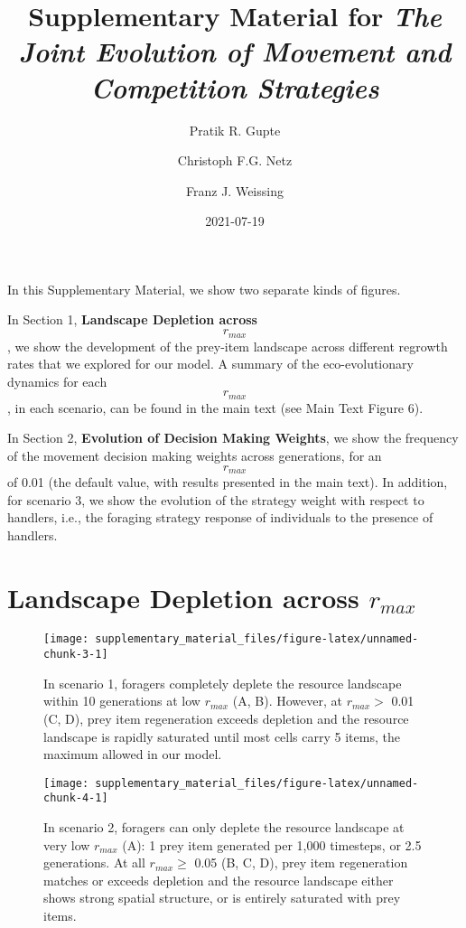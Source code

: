\documentclass[
]{scrreprt}
\title{Supplementary Material for \emph{The Joint Evolution of Movement and Competition Strategies}}
\author{Pratik R. Gupte \and Christoph F.G. Netz \and Franz J. Weissing}
\date{2021-07-19}
\begin{document}
\maketitle

In this Supplementary Material, we show two separate kinds of figures.

In Section 1, \textbf{Landscape Depletion across \[r_{max}\]}, we show the development of the prey-item landscape across different regrowth rates that we explored for our model. A summary of the eco-evolutionary dynamics for each \[r_{max}\], in each scenario, can be found in the main text (see Main Text Figure 6).

In Section 2, \textbf{Evolution of Decision Making Weights}, we show the frequency of the movement decision making weights across generations, for an \[r_{max}\] of 0.01 (the default value, with results presented in the main text). In addition, for scenario 3, we show the evolution of the strategy weight with respect to handlers, i.e., the foraging strategy response of individuals to the presence of handlers.

\hypertarget{landscape-depletion-across-r_max}{%
\chapter{\texorpdfstring{Landscape Depletion across \(r_{max}\)}{Landscape Depletion across r\_\{max\}}}\label{landscape-depletion-across-r_max}}

\begin{figure}

{\centering \texttt{[image: supplementary\_material\_files/figure-latex/unnamed-chunk-3-1]} 

}

\caption{In scenario 1, foragers completely deplete the resource landscape within 10 generations at low $r_{max}$ (A, B). However, at $r_{max} >$ 0.01 (C, D), prey item regeneration exceeds depletion and the resource landscape is rapidly saturated until most cells carry 5 items, the maximum allowed in our model.}\label{fig:unnamed-chunk-3}
\end{figure}

\begin{figure}

{\centering \texttt{[image: supplementary\_material\_files/figure-latex/unnamed-chunk-4-1]} 

}

\caption{In scenario 2, foragers can only deplete the resource landscape at very low $r_{max}$ (A): 1 prey item generated per 1,000 timesteps, or 2.5 generations. At all $r_{max} \geq$ 0.05 (B, C, D), prey item regeneration matches or exceeds depletion and the resource landscape either shows strong spatial structure, or is entirely saturated with prey items.}\label{fig:unnamed-chunk-4}
\end{figure}
\end{document}
